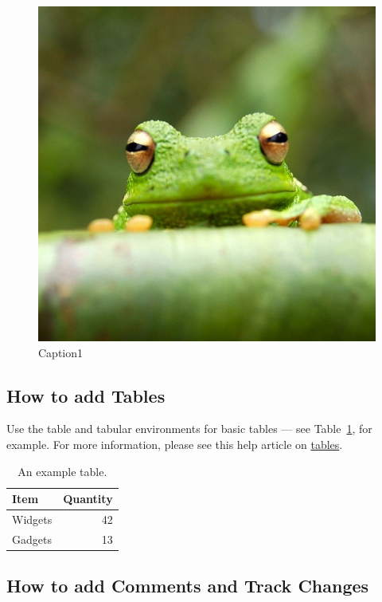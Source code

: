 \documentclass{article}
\begin{document}
    \begin{figure}
        \includegraphics[width=0.9\linewidth]{frog.jpg}
        \caption{Caption1}
        \label{fig:wrapfig}
    \end{figure}

    \subsection{How to add Tables}

    Use the table and tabular environments for basic tables --- see Table~\ref{tab:widgets}, for example. For more information, please see this help article on \href{https://www.overleaf.com/learn/latex/tables}{tables}.

    \begin{table}
        \centering
        \begin{tabular}{l|r}
            Item    & Quantity \\\hline
            Widgets & 42       \\
            Gadgets & 13
        \end{tabular}
        \caption{\label{tab:widgets}An example table.}
    \end{table}

    \subsection{How to add Comments and Track Changes}
\end{document}
